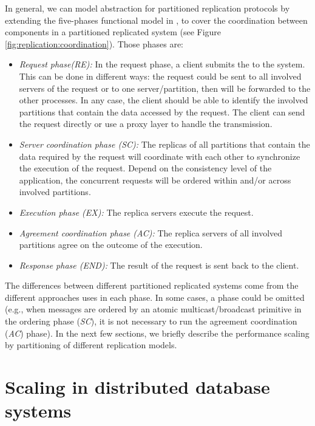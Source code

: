 In general, we can model abstraction for partitioned replication protocols by
extending the five-phases functional model in \cite{pedone:replication}, to
cover the coordination between components in a partitioned replicated system
(see Figure \ref{fig:replication:coordination}). Those phases are:
\begin{itemize}
  \item \textit{Request phase(RE):} In the request phase, a client submits the
     to the system. This can be done in different ways: the request could
  be sent to all involved servers of the request or to one server/partition,
  then will be forwarded to the other processes. In any case, the client should
  be able to identify the involved partitions that contain the data accessed by
  the request. The client can send the request directly or use a proxy layer to
  handle the transmission.
  \item \textit{Server coordination phase (SC):} The replicas of all partitions
  that contain the data required by the request will coordinate with each other
  to synchronize the execution of the request. Depend on the consistency level
  of the application, the concurrent requests will be ordered within and/or across
  involved partitions.
  \item \textit{Execution phase (EX):} The replica servers execute the request.
  \item \textit{Agreement coordination phase (AC):} The replica servers of all involved
  partitions agree on the outcome of the execution.
  \item \textit{Response phase (END):} The result of the request is sent back to the client.
\end{itemize}

The differences between different partitioned replicated systems come from the
different approaches uses in each phase. In some cases, a phase could be omitted
(e.g., when messages are ordered by an atomic multicast/broadcast primitive in
the ordering phase (\emph{SC}), it is not necessary to run the agreement
coordination (\emph{AC}) phase). In the next few sections, we briefly describe the
performance scaling by partitioning of different replication models.


\section{Scaling in distributed database systems}

